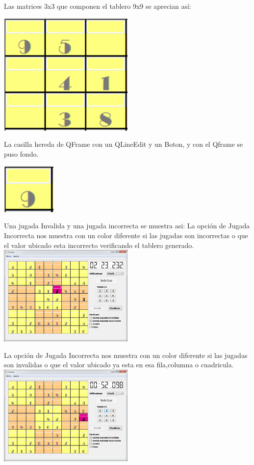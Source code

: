\documentclass[12pt,oneside]{book}
\begin{document}
\begin{center}
	Las matrices 3x3 que componen el tablero 9x9 se aprecian así:

	\includegraphics[width=0.5\textwidth]{./imagenes/cuadr9x9.png}

	La casilla hereda de QFrame con un QLineEdit y un Boton, y con el Qframe se puso fondo. 

	\includegraphics[width=0.2\textwidth]{./imagenes/Casilla.png}

	Una jugada Invalida y una jugada incorrecta se muestra asi:
		La opción de Jugada Incorrecta nos muestra con un color diferente si las jugadas son incorrectas o que 
	el valor ubicado esta incorrecto verificando el tablero generado.
	\includegraphics[width=0.5\textwidth]{./imagenes/jugada_incorrecta.png}

	La opción de Jugada Incorrecta nos muestra con un color diferente si las jugadas son invalidas o que el valor 
	ubicado ya esta en esa fila,columna o cuadricula.	
	\includegraphics[width=0.5\textwidth]{./imagenes/jugada_invalida.png}



\end{center}
\end{document}
